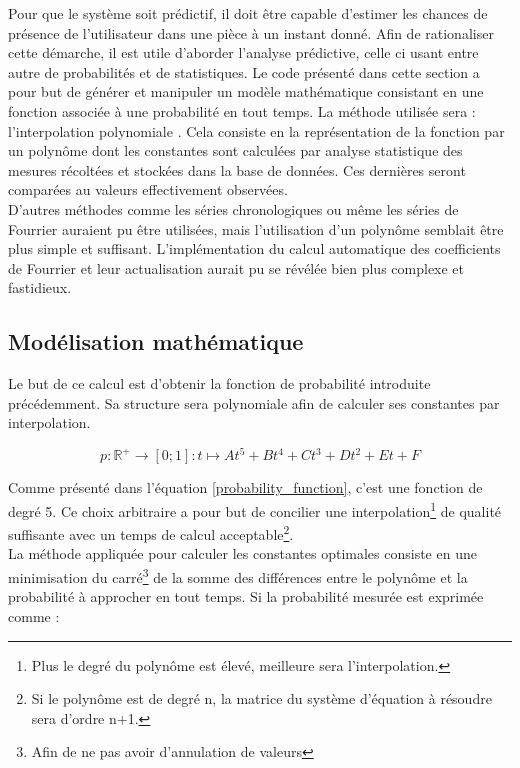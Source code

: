 \documentclass[11pt,a4paper,11pt]{report}
\begin{document}
Pour que le système soit prédictif, il doit être capable d'estimer les chances de présence de l'utilisateur dans une pièce à un instant donné. Afin de rationaliser cette démarche, il est utile d'aborder l'analyse prédictive, celle ci usant entre autre de probabilités et de statistiques. Le code présenté dans cette section a pour but de générer et manipuler un modèle mathématique consistant en une fonction associée à une probabilité en tout temps. La méthode utilisée sera : \og l'interpolation polynomiale \fg \cite{interpolation_polynomiale}. Cela consiste en la représentation de la fonction par un polynôme dont les constantes sont calculées par analyse statistique des mesures récoltées et stockées dans la base de données. Ces dernières seront comparées au valeurs effectivement observées.\\

D'autres méthodes comme les séries chronologiques ou même les séries de Fourrier auraient pu être utilisées, mais l'utilisation d'un polynôme semblait être plus simple et suffisant. L'implémentation du calcul automatique des coefficients de Fourrier et leur actualisation aurait pu se révélée bien plus complexe et fastidieux.


\subsection{Modélisation mathématique}
\label{proba_math}
Le but de ce calcul est d'obtenir la fonction de probabilité introduite précédemment. Sa structure sera polynomiale afin de calculer ses constantes par interpolation.

\begin{equation}
\label{probability_function}
p : \mathbb{R}^{+} \rightarrow [0;1] : t \mapsto At^{5}+Bt^{4}+Ct^{3}+Dt^{2}+Et+F
\end{equation}

Comme présenté dans l'équation \ref{probability_function}, c'est une fonction de degré 5. Ce choix arbitraire a pour but de concilier une interpolation\footnote{Plus le degré du polynôme est élevé, meilleure sera l'interpolation.} de qualité suffisante avec un temps de calcul acceptable\footnote{Si le polynôme est de degré n, la matrice du système d'équation à résoudre sera d'ordre n+1.}.\\

La méthode appliquée pour calculer les constantes optimales consiste en une minimisation du carré\footnote{Afin de ne pas avoir d'annulation de valeurs} de la somme des différences entre le polynôme et la probabilité à approcher en tout temps. Si la probabilité mesurée est exprimée comme :
\end{document}
